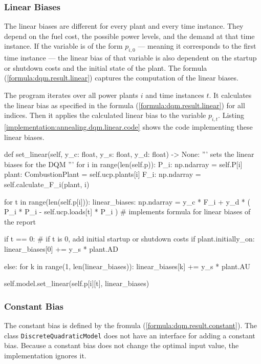 \subsubsection{Linear Biases}
\label{implementation:annealing.dqm.linear}

The linear biases are different for every plant and every time instance.
They depend on the fuel cost, the possible power levels, and the demand at that time instance.
If the variable is of the form $p_{i, 0}$ --- meaning it corresponds to the first time instance --- the linear bias of that variable is also dependent on the startup or shutdown costs and the initial state of the plant.
The formula (\ref{formula:dqm.result.linear}) captures the computation of the linear biases.

The program iterates over all power plants $i$ and time instances $t$.
It calculates the linear bias as specified in the formula (\ref{formula:dqm.result.linear}) for all indices.
Then it applies the calculated linear bias to the variable $p_{i, t}$.
Listing \ref{implementation:annealing.dqm.linear.code} shows the code implementing these linear biases.

\begin{python}[
  float,
  caption={Implementation of the Linear Biases for DQMs},
  label={implementation:annealing.dqm.linear.code}
]
  def set_linear(self, y_c: float, y_s: float, y_d: float) -> None:
    '''
    sets the linear biases for the DQM
    '''
    for i in range(len(self.p)):
      P_i: np.ndarray = self.P[i]
      plant: CombustionPlant = self.ucp.plants[i]
      F_i: np.ndarray = self.calculate_F_i(plant, i)

      for t in range(len(self.p[i])):
        linear_biases: np.ndarray = y_c * F_i + y_d * (
          P_i * P_i - self.ucp.loads[t] * P_i
        ) # implements formula for linear biases of the report

        if t == 0: # if t is 0, add initial startup or shutdown costs
          if plant.initially_on:
            linear_biases[0] += y_s * plant.AD

          else:
            for k in range(1, len(linear_biases)):
              linear_biases[k] += y_s * plant.AU

        self.model.set_linear(self.p[i][t], linear_biases)
\end{python}

\subsubsection{Constant Bias}

The constant bias is defined by the fromula (\ref{formula:dqm.result.constant}).
The class \texttt{DiscreteQuadraticModel} does not have an interface for adding a constant bias.
Because a constant bias does not change the optimal input value, the implementation ignores it.
